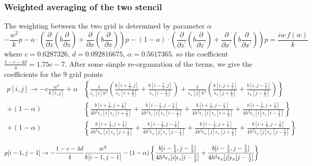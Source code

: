 \documentclass[revised,endfloat]{geophysics}
\begin{document}
\subsubsection{Weighted averaging of the two stencil}
The weighting between the two grid is determined by parameter $\alpha$
\begin{equation}
-\frac{w^2}{k}p - a \cdot \left( \frac{\partial}{\partial z}(b \frac{\partial }{\partial z}) + \frac{\partial}{\partial x}(b \frac{\partial }{\partial x}) \right)p - (1-a) \cdot \left( \frac{\partial}{\partial z^{\prime}}(b\frac{\partial }{\partial z^{\prime}}) + \frac{\partial}{\partial x^{\prime}}(b \frac{\partial }{\partial x^{\prime}}) \right)p  = \frac{iw\, f(w)}{k}
\label{eq113}
\end{equation}
where $c=0.6287326$, $d=0.092816675$, $\alpha=0.5617365$. so the coefficient $\frac{1-c-4d}{4} = 1.75e-7$.
After some simple re-organzation of the terms, we give the coefficients for the 9 grid points
\begin{equation}
\begin{split}
p[i,j] \rightarrow -c \frac{w^2}{k[i,j]}+\alpha &\left\{  \frac{1}{\epsilon_z[i] h^2}\left(\frac{b[i+\frac{1}{2},j]}{\epsilon_z[i+\frac{1}{2}]} +  \frac{b[i-\frac{1}{2},j]}{\epsilon_z[i-\frac{1}{2}]} \right) + \frac{1}{\epsilon_x[j] h^2} \left( \frac{b[i,j+\frac{1}{2}]}{\epsilon_x[j+\frac{1}{2}]} + \frac{b[i,j-\frac{1}{2}]}{\epsilon_x[j-\frac{1}{2}]}\right) \right\} \\
 + (1-\alpha) &  \left\{    \frac{b[i+\frac{1}{2}, j+\frac{1}{2}]}{4h^2 \epsilon_z[i] \epsilon_z[i+\frac{1}{2}]}     +    \frac{b[i-\frac{1}{2}, j-\frac{1}{2}]}{4h^2 \epsilon_z[i] \epsilon_z[i-\frac{1}{2}]}      +       \frac{b[i+\frac{1}{2}, j-\frac{1}{2}]}{4h^2 \epsilon_z[i] \epsilon_z[i+\frac{1}{2}]}        + \frac{b[i-\frac{1}{2}, j+\frac{1}{2}]}{4h^2 \epsilon_z[i] \epsilon_z[i-\frac{1}{2}]}   \right\} \\
  + (1-\alpha) &  \left\{   \frac{b[i+\frac{1}{2}, j+\frac{1}{2}]}{4h^2 \epsilon_x[j] \epsilon_x[j+\frac{1}{2}]}     +    \frac{b[i-\frac{1}{2}, j-\frac{1}{2}]}{4h^2 \epsilon_x[j] \epsilon_x[j-\frac{1}{2}]}      +       \frac{b[i-\frac{1}{2}, j+\frac{1}{2}]}{4h^2 \epsilon_x[j] \epsilon_x[j+\frac{1}{2}]}    + \frac{b[i+\frac{1}{2}, j-\frac{1}{2}]}{4h^2 \epsilon_x[j] \epsilon_x[j-\frac{1}{2}]}      \right\}
\end{split}
\label{eq114}
\end{equation}

\begin{equation}
p[i-1,j-1] \rightarrow -\frac{1-c-4d}{4} \frac{w^2}{k[i-1,j-1]} - (1-\alpha) \left\{ \frac{b[i-\frac{1}{2}, j-\frac{1}{2}]}{4h^2 \epsilon_z[i] \epsilon_z[i-\frac{1}{2}]} + \frac{b[i-\frac{1}{2}, j-\frac{1}{2}]}{4h^2 \epsilon_x[j] \epsilon_x[j-\frac{1}{2}]}  \right\} \\
\label{eq115}
\end{equation}
\end{document}
